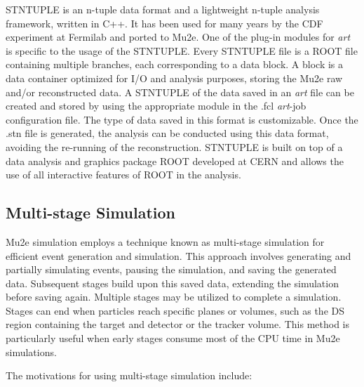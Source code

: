 STNTUPLE is an n-tuple data format and a lightweight n-tuple analysis framework, written in C++. It has been used for many years by the CDF experiment at Fermilab and ported to Mu2e. One of the plug-in modules for \textit{art} is specific to the usage of the STNTUPLE. Every STNTUPLE file is a ROOT file containing multiple branches, each corresponding to a data block. A block is a data container optimized for I/O and analysis purposes, storing the Mu2e raw and/or reconstructed data. A STNTUPLE of the data saved in an \textit{art} file can be created and stored by using the appropriate module in the .fcl \textit{art}-job configuration file. The type of data saved in this format is customizable. Once the .stn file is generated, the analysis can be conducted using this data format, avoiding the re-running of the reconstruction. STNTUPLE is built on top of a data analysis and graphics package ROOT developed at CERN and allows the use of all interactive features of ROOT in the analysis.

\subsection{Multi-stage Simulation}

Mu2e simulation employs a technique known as multi-stage simulation for efficient event generation and simulation. This approach involves generating and partially simulating events, pausing the simulation, and saving the generated data. Subsequent stages build upon this saved data, extending the simulation before saving again. Multiple stages may be utilized to complete a simulation. Stages can end when particles reach specific planes or volumes, such as the DS region containing the target and detector or the tracker volume. This method is particularly useful when early stages consume most of the CPU time in Mu2e simulations.

The motivations for using multi-stage simulation include:

